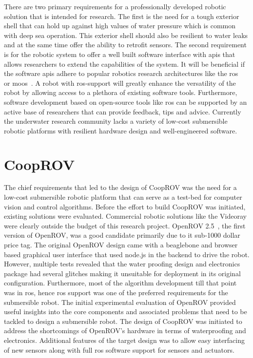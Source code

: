 There are two primary requirements for a professionally developed robotic solution that is intended for research. The first is the need for a tough exterior shell that can hold up against high values of water pressure which is common with deep sea operation. This exterior shell should also be resilient to water leaks and at the same time offer the ability to retrofit sensors. The second requirement is for the robotic system to offer a well built software interface with \gls{api}s that allows researchers to extend the capabilities of the system. It will be beneficial if the software \gls{api}s adhere to popular robotics research architectures like the \gls{ros}~\cite{ros, ros_paper} or \gls{moos}~\cite{moos, moos_paper}. A robot with \gls{ros}-support will greatly enhance the versatility of the robot by allowing access to a plethora of existing software tools. Furthermore, software development based on open-source tools like \gls{ros} can be supported by an active base of researchers that can provide feedback, 
tips and advice. Currently the underwater research community lacks a variety of low-cost submersible 
robotic platforms with resilient hardware design and well-engineered software.

\section{CoopROV}

The chief requirements that led to the design of CoopROV was the need for a low-cost submersible robotic platform that can serve as a test-bed for computer vision and control algorithms. Before the effort to build CoopROV was initiated, existing solutions were evaluated. Commercial robotic solutions like the Videoray were clearly outside the budget of this research project. OpenROV 2.5~\cite{openrov}, the first version of OpenROV, was a good candidate primarily due to it sub-1000 dollar price tag. The original OpenROV design came with a beaglebone and browser based graphical user interface that used node.js \cite{nodejs} in the backend to drive the robot. However, multiple tests revealed that the water proofing design and electronics package had several glitches making it unsuitable for deployment in its original configuration. Furthermore, most of the algorithm development till that point was in \gls{ros}, hence \gls{ros} support was one of the 
preferred requirements for the submersible robot. The initial experimental evaluation of OpenROV provided useful insights into the core components and associated problems that need to be tackled to design a submersible robot. The design of CoopROV was initiated to address the shortcomings of OpenROV's hardware in terms of waterproofing and electronics. Additional features of the target design was to allow easy interfacing of new sensors along with full \gls{ros} software support for sensors and actuators.

